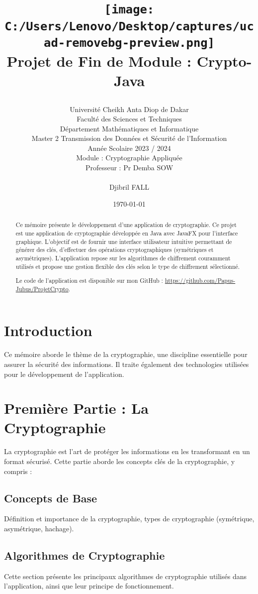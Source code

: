 \documentclass[a4paper,12pt]{report}
\title{
	\begin{center} %
		\texttt{[image: C:/Users/Lenovo/Desktop/captures/ucad-removebg-preview.png]} \\[1.5em] %
		\textbf{Projet de Fin de Module : Crypto-Java} \\[2em] %
	\end{center}
}
\author{
	Université Cheikh Anta Diop de Dakar \\ 
	Faculté des Sciences et Techniques \\ 
	Département Mathématiques et Informatique \\ 
	Master 2 Transmission des Données et Sécurité de l'Information \\ 
	Année Scolaire 2023 / 2024 \\ 
	Module : Cryptographie Appliquée \\ 
	Professeur : Pr Demba SOW \\ 
	\\
	Djibril FALL }
\date{\today}
\begin{document}
	
	\maketitle
	
	\begin{abstract}
		Ce mémoire présente le développement d'une application de cryptographie. Ce projet est une application de cryptographie développée en Java avec JavaFX pour l'interface graphique. L'objectif est de fournir une interface utilisateur intuitive permettant de générer des clés, d'effectuer des opérations cryptographiques (symétriques et asymétriques). L'application repose sur les algorithmes de chiffrement couramment utilisés et propose une gestion flexible des clés selon le type de chiffrement sélectionné.
		
		Le code de l'application est disponible sur mon GitHub : \url{https://github.com/Papus-Jubus/ProjetCrypto}.
		
		
	\end{abstract}
	
	\tableofcontents
	
	\chapter{Introduction}
	Ce mémoire aborde le thème de la cryptographie, une discipline essentielle pour assurer la sécurité des informations. Il traite également des technologies utilisées pour le développement de l'application.
	
	\chapter{Première Partie : La Cryptographie}
	La cryptographie est l'art de protéger les informations en les transformant en un format sécurisé. Cette partie aborde les concepts clés de la cryptographie, y compris :
	
	\section{Concepts de Base}
	Définition et importance de la cryptographie, types de cryptographie (symétrique, asymétrique, hachage).
	
	\section{Algorithmes de Cryptographie}
	Cette section présente les principaux algorithmes de cryptographie utilisés dans l'application, ainsi que leur principe de fonctionnement.
	
\end{document}
